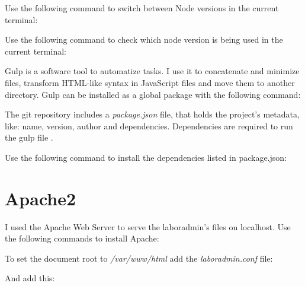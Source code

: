 Use the following command to switch between Node versions in the current terminal:


Use the following command to check which node version is being used in the current terminal:


\label{gulp}Gulp is a software tool to automatize tasks. I use it to concatenate and minimize files, transform HTML-like syntax in JavaScript files and move them to another directory. Gulp can be installed as a global package with the following command:


The git repository includes a \emph{package.json} file, that holds the project's metadata, like: name, version, author and dependencies. Dependencies are required to run the gulp file .

Use the following command to install the dependencies listed in package.json:


\section{Apache2}
I used the Apache Web Server to serve the laboradmin's files on localhost. Use the following commands to install Apache:

	
To set the document root to \emph{/var/www/html} add the \emph{laboradmin.conf} file:


And add this:

